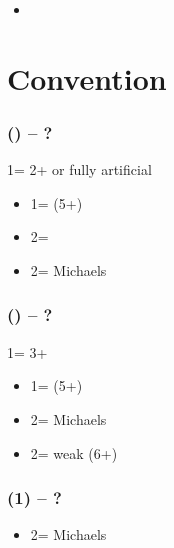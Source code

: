 \documentclass[12pt, a4paper]{article}
\begin{document}
\begin{itemize}

    \item
\end{itemize}


\section{Convention}


\subsubsection*{(\alrts{1\clubs}) -- ?}
1\clubs = 2+ or fully artificial
\begin{itemize}
    \item 1\diams = \nat (5+)
    \item 2\clubs = \nat
    \item 2\diams = Michaels
\end{itemize}

\subsubsection*{(\alrts{1\clubs}) -- ?}
1\clubs = 3+
\begin{itemize}
    \item 1\diams = \nat (5+)
    \item 2\clubs = Michaels
    \item 2\diams = weak (6+)
\end{itemize}

\subsubsection*{(1\diams) -- ?}
\begin{itemize}
    \item 2\diams = Michaels
\end{itemize}


\end{document}
